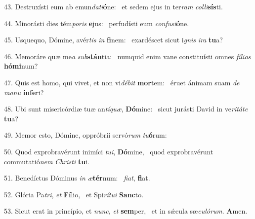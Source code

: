 43. Destruxísti eum ab emun\textit{da}\textit{ti}\textbf{ó}ne: \ast\  et sedem ejus in ter\textit{ram} \textit{col}\textit{li}\textbf{sís}ti.\

44. Minorásti dies tém\textit{po}\textit{ris} \textbf{e}jus: \ast\  perfudísti eum \textit{con}\textit{fu}\textit{si}\textbf{ó}ne.\

45. Usquequo, Dómine, avér\textit{tis} \textit{in} \textbf{fi}nem: \ast\  exardéscet sicut i\textit{gnis} \textit{i}\textit{ra} \textbf{tu}a?\

46. Memoráre quæ me\textit{a} \textit{sub}\textbf{stán}tia: \ast\  numquid enim vane constituísti omnes \textit{fí}\textit{li}\textit{os} \textbf{hó}\textbf{mi}num?\

47. Quis est homo, qui vivet, et non vi\textit{dé}\textit{bit} \textbf{mor}tem: \ast\  éruet ánimam suam \textit{de} \textit{ma}\textit{nu} \textbf{ín}\textbf{fe}ri?\

48. Ubi sunt misericórdiæ tuæ an\textit{tí}\textit{quæ}, \textbf{Dó}mine: \ast\  sicut jurásti David in ve\textit{ri}\textit{tá}\textit{te} \textbf{tu}a?\

49. Memor esto, Dómine, oppróbrii servó\textit{rum} \textit{tu}\textbf{ó}rum: \ast\  \

50. Quod exprobravérunt inimíci \textit{tu}\textit{i}, \textbf{Dó}mine, \ast\  quod exprobravérunt commutatió\textit{nem} \textit{Chris}\textit{ti} \textbf{tu}i.\

51. Benedíctus Dóminus \textit{in} \textit{æ}\textbf{tér}num: \ast\  \textit{fi}\textit{at}, \textbf{fi}at.\

52. Glória Pa\textit{tri}, \textit{et} \textbf{Fí}lio, \ast\  et Spi\textit{rí}\textit{tu}\textit{i} \textbf{Sanc}to.\

53. Sicut erat in princípio, et \textit{nunc}, \textit{et} \textbf{sem}per, \ast\  et in sǽcula sæ\textit{cu}\textit{ló}\textit{rum}. \textbf{A}men.\

